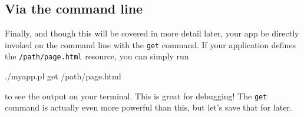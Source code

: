 \subsection{Via the command line}

Finally, and though this will be covered in more detail later, your app be directly invoked on the command line with the \verb!get! command.
If your application defines the \verb!/path/page.html! resource, you can simply run 
\begin{bash}
./myapp.pl get /path/page.html
\end{bash}
to see the output on your terminal.
This is great for debugging!
The \verb!get! command is actually even more powerful than this, but let's save that for later.



